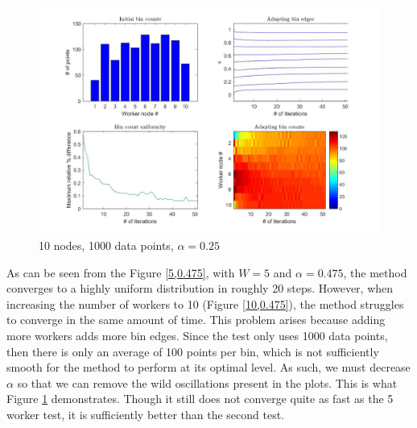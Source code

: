 \documentclass{article}
\begin{document}
\begin{figure}[!htb]
	\centering
	\vspace{-5pt}
	\includegraphics[scale = 0.25]{AdaptiveBinning_10Nodes_1000Lines_0250alpha}
	\vspace{-10pt}
	\caption{10 nodes, 1000 data points, $\alpha = 0.25$}
	\label{10,0.250}
\end{figure}

As can be seen from the Figure \ref{5,0.475}, with $W=5$ and $\alpha=0.475$, the method converges to a highly uniform distribution in roughly 20 steps. However, when increasing the number of workers to 10 (Figure \ref{10,0.475}), the method struggles to converge in the same amount of time. This problem arises because adding more workers adds more bin edges. Since the test only uses 1000 data points, then there is only an average of 100 points per bin, which is not sufficiently smooth for the method to perform at its optimal level. As such, we must decrease $\alpha$ so that we can remove the wild oscillations present in the plots. This is what Figure \ref{10,0.250} demonstrates. Though it still does not converge quite as fast as the 5 worker test, it is sufficiently better than the second test.
\end{document}
